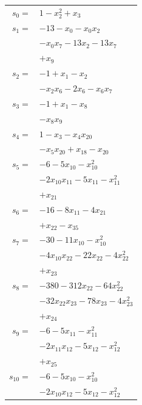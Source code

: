 \begingroup
\small
\setlength{\tabcolsep}{2pt}
\setlength{\LTleft}{0pt}
\begin{longtable}{@{}r@{\;}l@{}}
\(s_{0}=\) & \(\displaystyle 1 -x_{2}^{2} +x_{3}\) \\[3pt]
\(s_{1}=\) & \(\displaystyle -13 -x_{0} -x_{0}x_{2}\) \\
 & \(\displaystyle -x_{0}x_{7} -13x_{2} -13x_{7}\) \\
 & \(\displaystyle +x_{9}\) \\[3pt]
\(s_{2}=\) & \(\displaystyle -1 +x_{1} -x_{2}\) \\
 & \(\displaystyle -x_{2}x_{6} -2x_{6} -x_{6}x_{7}\) \\[3pt]
\(s_{3}=\) & \(\displaystyle -1 +x_{1} -x_{8}\) \\
 & \(\displaystyle -x_{8}x_{9}\) \\[3pt]
\(s_{4}=\) & \(\displaystyle 1 -x_{3} -x_{4}x_{20}\) \\
 & \(\displaystyle -x_{5}x_{20} +x_{18} -x_{20}\) \\[3pt]
\(s_{5}=\) & \(\displaystyle -6 -5x_{10} -x_{10}^{2}\) \\
 & \(\displaystyle -2x_{10}x_{11} -5x_{11} -x_{11}^{2}\) \\
 & \(\displaystyle +x_{21}\) \\[3pt]
\(s_{6}=\) & \(\displaystyle -16 -8x_{11} -4x_{21}\) \\
 & \(\displaystyle +x_{22} -x_{35}\) \\[3pt]
\(s_{7}=\) & \(\displaystyle -30 -11x_{10} -x_{10}^{2}\) \\
 & \(\displaystyle -4x_{10}x_{22} -22x_{22} -4x_{22}^{2}\) \\
 & \(\displaystyle +x_{23}\) \\[3pt]
\(s_{8}=\) & \(\displaystyle -380 -312x_{22} -64x_{22}^{2}\) \\
 & \(\displaystyle -32x_{22}x_{23} -78x_{23} -4x_{23}^{2}\) \\
 & \(\displaystyle +x_{24}\) \\[3pt]
\(s_{9}=\) & \(\displaystyle -6 -5x_{11} -x_{11}^{2}\) \\
 & \(\displaystyle -2x_{11}x_{12} -5x_{12} -x_{12}^{2}\) \\
 & \(\displaystyle +x_{25}\) \\[3pt]
\(s_{10}=\) & \(\displaystyle -6 -5x_{10} -x_{10}^{2}\) \\
 & \(\displaystyle -2x_{10}x_{12} -5x_{12} -x_{12}^{2}\) \\

\end{longtable}

